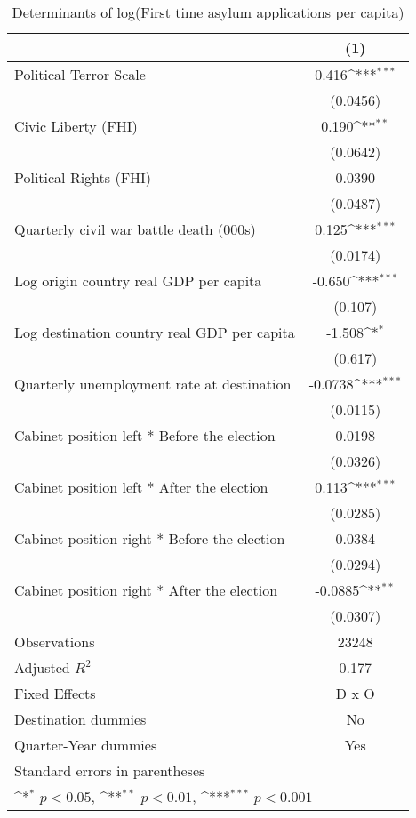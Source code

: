 \begin{table}[htbp]\centering
\def\sym#1{\ifmmode^{#1}\else\(^{#1}\)\fi}
\caption{Determinants of log(First time asylum applications per capita)}
\begin{tabular}{l*{1}{c}}
\hline\hline
                    &\multicolumn{1}{c}{(1)}         \\
\hline
Political Terror Scale&       0.416\sym{***}\\
                    &    (0.0456)         \\
[1em]
Civic Liberty (FHI) &       0.190\sym{**} \\
                    &    (0.0642)         \\
[1em]
Political Rights (FHI)&      0.0390         \\
                    &    (0.0487)         \\
[1em]
Quarterly civil war battle death (000s)&       0.125\sym{***}\\
                    &    (0.0174)         \\
[1em]
Log origin country real GDP per capita&      -0.650\sym{***}\\
                    &     (0.107)         \\
[1em]
Log destination country real GDP per capita&      -1.508\sym{*}  \\
                    &     (0.617)         \\
[1em]
Quarterly unemployment rate at destination&     -0.0738\sym{***}\\
                    &    (0.0115)         \\
[1em]
Cabinet position left * Before the election&      0.0198         \\
                    &    (0.0326)         \\
[1em]
Cabinet position left * After the election&       0.113\sym{***}\\
                    &    (0.0285)         \\
[1em]
Cabinet position right * Before the election&      0.0384         \\
                    &    (0.0294)         \\
[1em]
Cabinet position right * After the election&     -0.0885\sym{**} \\
                    &    (0.0307)         \\
\hline
Observations        &       23248         \\
Adjusted \(R^{2}\)  &       0.177         \\
Fixed Effects       &       D x O         \\
Destination dummies &          No         \\
Quarter-Year dummies&         Yes         \\
\hline\hline
\multicolumn{2}{l}{\footnotesize Standard errors in parentheses}\\
\multicolumn{2}{l}{\footnotesize \sym{*} \(p<0.05\), \sym{**} \(p<0.01\), \sym{***} \(p<0.001\)}\\
\end{tabular}
\end{table}
